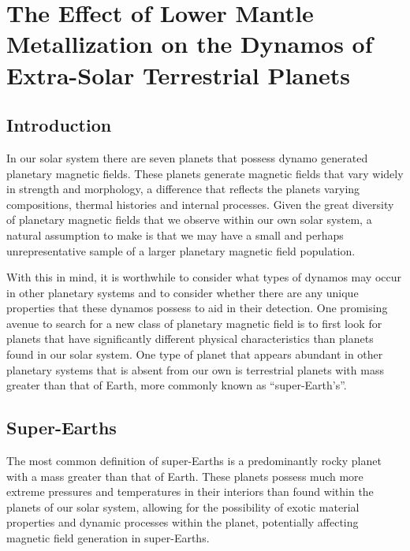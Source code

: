 
\chapter{The Effect of Lower Mantle Metallization on the Dynamos of Extra-Solar Terrestrial Planets}
\label{chap:superearth}

\section{Introduction}
In our solar system there are seven planets that possess dynamo generated planetary magnetic fields. These planets generate magnetic fields that vary widely in strength and morphology, a difference that reflects the planets varying compositions, thermal histories and internal processes. Given the great diversity of planetary magnetic fields that we observe within our own solar system, a natural assumption to make is that we may have a small and perhaps unrepresentative sample of a larger planetary magnetic field population.

With this in mind, it is worthwhile to consider what types of dynamos may occur in other planetary systems and to consider whether there are any unique  properties that these dynamos possess to aid in their detection. One promising avenue to search for a new class of planetary magnetic field is to first look for planets that have significantly different physical characteristics than planets found in our solar system. One type of planet that appears abundant in other planetary systems that is absent from our own is terrestrial planets with mass greater than that of Earth, more commonly known as ``super-Earth's''. 

\section{Super-Earths}
The most common definition of super-Earths is a predominantly rocky planet with a mass greater than that of Earth. These planets possess much more extreme pressures and temperatures in their interiors than found within the planets of our solar system, allowing for the possibility of exotic material properties and dynamic processes within the planet, potentially affecting magnetic field generation in super-Earths. 

